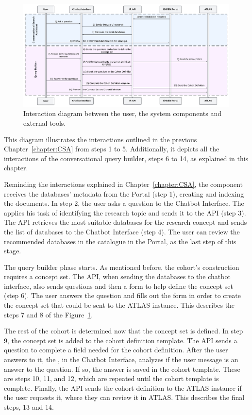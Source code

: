 \begin{figure}[H]
  \includegraphics[width=\textwidth]{figs/chapter4/interaction_diagram.png}
  \centering
  \caption[Interaction diagram between components]{Interaction diagram between the user, the system components and external tools.}
  \label{fig_interaction}
\end{figure}

This diagram illustrates the interactions outlined in the previous Chapter~\ref{chapter:CSA} from steps 1 to 5. Additionally, it depicts all the interactions of the conversational query builder, steps 6 to 14, as explained in this chapter.

Reminding the interactions explained in Chapter~\ref{chapter:CSA}, the {\ir} component receives the databases' metadata from the {\ehden} Portal (step 1), creating and indexing the documents. In step 2, the user asks a question to the Chatbot Interface. The {\llm} applies his task of identifying the research topic and sends it to the {\ir} API (step 3). The {\ir} API retrieves the most suitable databases for the research concept and sends the list of databases to the Chatbot Interface (step 4). The user can review the recommended databases in the catalogue in the {\ehden} Portal, as the last step of this stage.

The query builder phase starts. As mentioned before, the cohort's construction requires a concept set. The {\ir} API, when sending the databases to the chatbot interface, also sends questions and then a form to help define the concept set (step 6). The user answers the question and fills out the form in order to create the concept set that could be sent to the ATLAS instance. This describes the steps 7 and 8 of the Figure~\ref{fig_interaction}. 

The rest of the cohort is determined now that the concept set is defined. In step 9, the concept set is added to the cohort definition template. The {\ir} API sends a question to complete a field needed for the cohort definition. After the user answers to it, the {\llm}, in the Chatbot Interface, analyzes if the user message is an answer to the question. If so, the answer is saved in the cohort template. These are steps 10, 11, and 12, which are repeated until the cohort template is complete. Finally, the API sends the cohort definition to the ATLAS instance if the user requests it, where they can review it in ATLAS. This describes the final steps, 13 and 14. 


